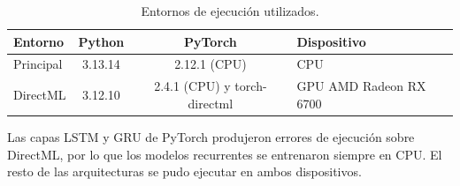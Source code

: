 \begin{table}[h]
	\centering
	\caption{Entornos de ejecución utilizados.}
	\begin{tabular}{l c c l}
		\toprule
		\textbf{Entorno} & \textbf{Python} & \textbf{PyTorch} & \textbf{Dispositivo} \\
		\midrule
		Principal & 3.13.14 & 2.12.1 (CPU) & CPU \\
		DirectML & 3.12.10 & 2.4.1 (CPU) y torch-directml & GPU AMD Radeon RX 6700 \\
		\bottomrule
	\end{tabular}
	\label{tab:entornos}
\end{table}

Las capas LSTM y GRU de PyTorch produjeron errores de ejecución sobre DirectML, por lo que los modelos recurrentes se entrenaron siempre en CPU. El resto de las arquitecturas se pudo ejecutar en ambos dispositivos.
